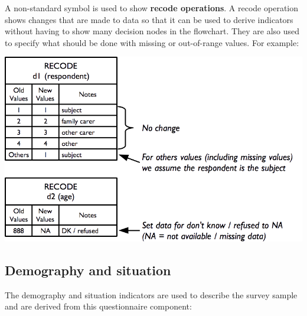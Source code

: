 \documentclass[12pt,a4paper]{book}
\theoremstyle{definition}
\theoremstyle{definition}
\theoremstyle{definition}
\theoremstyle{remark}
\begin{document}
A non-standard symbol is used to show \textbf{recode operations}. A
recode operation shows changes that are made to data so that it can be
used to derive indicators without having to show many decision nodes in
the flowchart. They are also used to specify what should be done with
missing or out-of-range values. For example:

\begin{center}\includegraphics{figures/indicators02} \end{center}

\hypertarget{demography-and-situation}{%
\subsection{Demography and situation}\label{demography-and-situation}}

The demography and situation indicators are used to describe the survey
sample and are derived from this questionnaire component:
\end{document}
